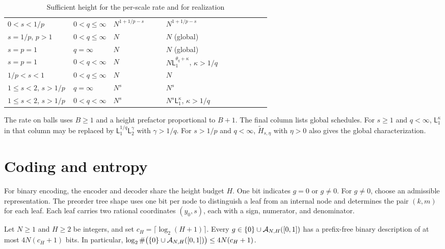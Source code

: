 \documentclass[11pt,a4paper]{article}
\begin{document}
\begin{table}[H]
\centering
\caption{Sufficient height for the per-scale rate and for realization}
\label{lp:tab:schedules}
\small
\tablecolors
\begin{tabularx}{\linewidth}{L{0.25\linewidth}L{0.15\linewidth}L{0.20\linewidth}>{\raggedright\arraybackslash}X}
\toprule
{} &  &  &  \\
\midrule
$0<s<1/p$ & $0<q\le\infty$ & $N^{1+1/p-s}$ & $N^{1+1/p-s}$ \\
$s=1/p$, $p>1$ & $0<q\le\infty$ & $N$ & $N$ (global) \\
$s=p=1$ & $q=\infty$ & $N$ & $N$ (global) \\
$s=p=1$ & $0<q<\infty$ & $N$ & $N\mathsf L_1^{\theta_q+\kappa}$, $\kappa>1/q$ \\
$1/p<s<1$ & $0<q\le\infty$ & $N$ & $N$ \\
$1\le s<2$, $s>1/p$ & $q=\infty$ & $N^s$ & $N^s$ \\
$1\le s<2$, $s>1/p$ & $0<q<\infty$ & $N^s$ & $N^s\mathsf L_1^\kappa$, $\kappa>1/q$ \\
\bottomrule
\end{tabularx}
\par\raggedright
\par\smallskip\noindent
The rate on balls uses $B\ge1$ and a height prefactor proportional to $B+1$. The final column lists global schedules. For $s\ge1$ and $q<\infty$, $\mathsf L_1^\kappa$ in that column may be replaced by $\mathsf L_1^{1/q}\mathsf L_2^\gamma$ with $\gamma>1/q$. For $s>1/p$ and $q<\infty$, $\widetilde H_{s,\eta}$ with $\eta>0$ also gives the global characterization.
\end{table}

\section{Coding and entropy}
\label{lp:sec:bits}

For binary encoding, the encoder and decoder share the height budget $H$. One bit indicates $g=0$ or $g\ne0$. For $g\ne0$, choose an admissible representation. The preorder tree shape uses one bit per node to distinguish a leaf from an internal node and determines the pair $(k,m)$ for each leaf. Each leaf carries two rational coordinates $(y_0,s)$, each with a sign, numerator, and denominator.

\begin{proposicao}
\label{lp:prop:bits}
Let $N\ge1$ and $H\ge2$ be integers, and set $c_H=\lceil\log_2(H+1)\rceil$. Every $g\in\{0\}\cup\mathcal A_{N,H}([0,1])$ has a prefix-free binary description of at most $4N(c_H+1)$ bits. In particular, $\log_2\#\bigl(\{0\}\cup\mathcal A_{N,H}([0,1])\bigr)\le4N(c_H+1)$.
\end{proposicao}
\end{document}
